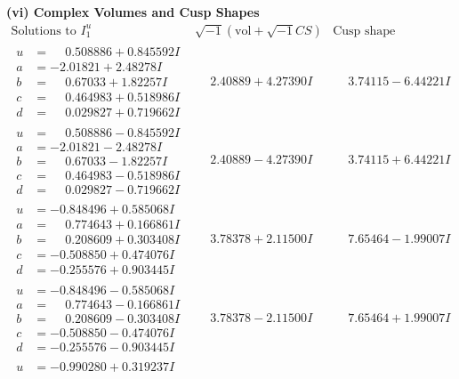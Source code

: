 \documentclass[1p]{elsarticle_modified}
\theoremstyle{definition}
\newcommand{\I}{\sqrt{-1}}
\begin{document}
\newpage\flushleft \textbf{(vi) Complex Volumes and Cusp Shapes}
$$\begin{array}{c|c|c}  
\text{Solutions to }I^u_{1}& \I (\text{vol} + \sqrt{-1}CS) & \text{Cusp shape}\\
 \hline 
\begin{aligned}
u &= \phantom{-}0.508886 + 0.845592 I \\
a &= -2.01821 + 2.48278 I \\
b &= \phantom{-}0.67033 + 1.82257 I \\
c &= \phantom{-}0.464983 + 0.518986 I \\
d &= \phantom{-}0.029827 + 0.719662 I\end{aligned}
 & \phantom{-}2.40889 + 4.27390 I & \phantom{-}3.74115 - 6.44221 I \\ \hline\begin{aligned}
u &= \phantom{-}0.508886 - 0.845592 I \\
a &= -2.01821 - 2.48278 I \\
b &= \phantom{-}0.67033 - 1.82257 I \\
c &= \phantom{-}0.464983 - 0.518986 I \\
d &= \phantom{-}0.029827 - 0.719662 I\end{aligned}
 & \phantom{-}2.40889 - 4.27390 I & \phantom{-}3.74115 + 6.44221 I \\ \hline\begin{aligned}
u &= -0.848496 + 0.585068 I \\
a &= \phantom{-}0.774643 + 0.166861 I \\
b &= \phantom{-}0.208609 + 0.303408 I \\
c &= -0.508850 + 0.474076 I \\
d &= -0.255576 + 0.903445 I\end{aligned}
 & \phantom{-}3.78378 + 2.11500 I & \phantom{-}7.65464 - 1.99007 I \\ \hline\begin{aligned}
u &= -0.848496 - 0.585068 I \\
a &= \phantom{-}0.774643 - 0.166861 I \\
b &= \phantom{-}0.208609 - 0.303408 I \\
c &= -0.508850 - 0.474076 I \\
d &= -0.255576 - 0.903445 I\end{aligned}
 & \phantom{-}3.78378 - 2.11500 I & \phantom{-}7.65464 + 1.99007 I \\ \hline\begin{aligned}
u &= -0.990280 + 0.319237 I \\

\end{aligned}
\end{array}$$
\end{document}
